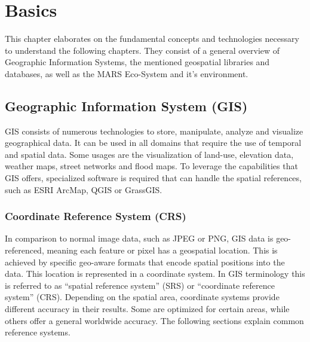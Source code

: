 
\chapter{Basics}
This chapter elaborates on the fundamental concepts and technologies necessary to understand the following chapters. They consist of a general overview of Geographic Information Systems, the mentioned geospatial libraries and databases, as well as the MARS Eco-System and it's environment.



\section{Geographic Information System (GIS)}
GIS consists of numerous technologies to store, manipulate, analyze and visualize geographical data. It can be used in all domains that require the use of temporal and spatial data. Some usages are the visualization of land-use, elevation data, weather maps, street networks and flood maps. To leverage the capabilities that GIS offers, specialized software is required that can handle the spatial references, such as ESRI ArcMap, QGIS or GrassGIS.


\subsection{Coordinate Reference System (CRS)}
In comparison to normal image data, such as JPEG or PNG, GIS data is geo-referenced, meaning each feature or pixel has a geospatial location. This is achieved by specific geo-aware formats that encode spatial positions into the data. This location is represented in a coordinate system. In GIS terminology this is referred to as \enquote{spatial reference system} (SRS) or \enquote{coordinate reference system} (CRS). Depending on the spatial area, coordinate systems provide different accuracy in their results. Some are optimized for certain areas, while others offer a general worldwide accuracy. The following sections explain common reference systems.


